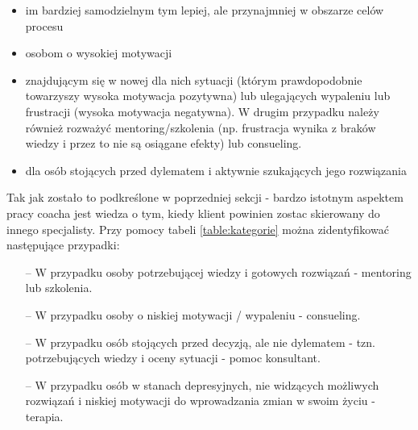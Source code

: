 \begin{itemize}
  \item im bardziej samodzielnym tym lepiej, ale przynajmniej w obszarze celów procesu
  \item osobom o wysokiej motywacji
  \item znajdującym się w nowej dla nich sytuacji (którym prawdopodobnie towarzyszy wysoka motywacja pozytywna) lub
       ulegających wypaleniu lub frustracji (wysoka motywacja negatywna). W drugim przypadku należy również rozważyć
       mentoring/szkolenia (np. frustracja wynika z braków wiedzy i przez to nie są osiągane efekty) lub consueling.
  \item dla osób stojących przed dylematem i aktywnie szukających jego rozwiązania
\end{itemize}

Tak jak zostało to podkreślone w poprzedniej sekcji - bardzo istotnym aspektem pracy coacha jest wiedza o tym, kiedy klient powinien
zostac skierowany do innego specjalisty. Przy pomocy tabeli \ref{table:kategorie} można zidentyfikować następujące przypadki:
\begin{itemize}
\item[--] W przypadku osoby potrzebującej wiedzy i gotowych rozwiązań - mentoring lub szkolenia.
\item[--] W przypadku osoby o niskiej motywacji / wypaleniu - consueling.
\item[--] W przypadku osób stojących przed decyzją, ale nie dylematem - tzn. potrzebujących wiedzy i oceny sytuacji - pomoc konsultant.
\item[--] W przypadku osób w stanach depresyjnych, nie widzących możliwych rozwiązań i niskiej motywacji do wprowadzania zmian w swoim życiu - terapia.
\end{itemize}
